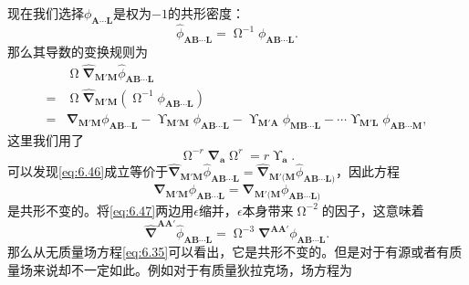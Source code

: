 现在我们选择$\phi _{\boldsymbol{A} \cdots \boldsymbol{L}}$是权为$-1$的共形密度：
\begin{equation*}
	\hat{\phi }_{\boldsymbol{AB} \cdots \boldsymbol{L}} =\upOmega^{-1} \phi _{\boldsymbol{AB} \cdots \boldsymbol{L}} .
\end{equation*}
那么其导数的变换规则为
\begin{equation}
	\begin{aligned}
		& \upOmega\hat{\mathbf{\nabla }}_{\boldsymbol{M} '\boldsymbol{M}}\hat{\phi }_{\boldsymbol{AB} \cdots \boldsymbol{L}}\\
		= & \upOmega\hat{\mathbf{\nabla }}_{\boldsymbol{M} '\boldsymbol{M}} (\upOmega^{-1} \phi _{\boldsymbol{AB} \cdots \boldsymbol{L}} )\\
		= & \mathbf{\nabla }_{\boldsymbol{M} '\boldsymbol{M}} \phi _{\boldsymbol{AB} \cdots \boldsymbol{L}} -\upUpsilon _{\boldsymbol{M} '\boldsymbol{M}} \phi _{\boldsymbol{AB} \cdots \boldsymbol{L}} -\upUpsilon _{\boldsymbol{M} '\boldsymbol{A}} \phi _{\boldsymbol{MB} \cdots \boldsymbol{L}} -\cdots \upUpsilon _{\boldsymbol{M} '\boldsymbol{L}} \phi _{\boldsymbol{AB} \cdots \boldsymbol{M}} ,
	\end{aligned}
	\label{eq:6.47}
\end{equation}
这里我们用了
\begin{equation*}
	\upOmega^{-r}\mathbf{\nabla }_{\boldsymbol{a}} \upOmega^{r} =r\upUpsilon _{\boldsymbol{a}} .
\end{equation*}
可以发现\ref{eq:6.46}成立等价于$\hat{\mathbf{\nabla }}_{\boldsymbol{M} '\boldsymbol{M}}\hat{\phi }_{\boldsymbol{AB} \cdots \boldsymbol{L}} =\hat{\mathbf{\nabla }}_{\boldsymbol{M} '(\boldsymbol{M}}\hat{\phi }_{\boldsymbol{AB} \cdots \boldsymbol{L})}$，因此方程
\begin{equation*}
	\mathbf{\nabla }_{\boldsymbol{M} '\boldsymbol{M}} \phi _{\boldsymbol{AB} \cdots \boldsymbol{L}} =\mathbf{\nabla }_{\boldsymbol{M} '(\boldsymbol{M}} \phi _{\boldsymbol{AB} \cdots \boldsymbol{L})}
\end{equation*}
是共形不变的。将\ref{eq:6.47}两边用$\epsilon $缩并，$\epsilon $本身带来$\upOmega^{-2}$的因子，这意味着
\begin{equation*}
	\hat{\mathbf{\nabla }}^{\boldsymbol{AA} '}\hat{\phi }_{\boldsymbol{AB} \cdots \boldsymbol{L}} =\upOmega^{-3}\mathbf{\nabla }^{\boldsymbol{AA} '} \phi _{\boldsymbol{AB} \cdots \boldsymbol{L}} .
\end{equation*}
那么从无质量场方程\ref{eq:6.35}可以看出，它是共形不变的。但是对于有源或者有质量场来说却不一定如此。例如对于有质量狄拉克场，场方程为
